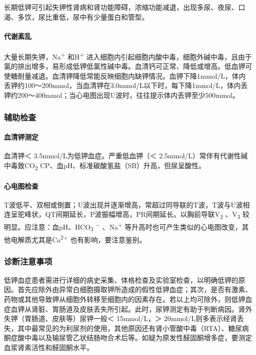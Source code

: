 长期低钾可引起失钾性肾病和肾功能障碍，浓缩功能减退，出现多尿、夜尿、口渴、多饮，尿比重低，尿中有少量蛋白和管型。

\paragraph{代谢紊乱}

大量长期失钾，Na\textsuperscript{+} 和H\textsuperscript{+}
进入细胞内引起细胞内酸中毒，细胞外碱中毒，且由于氯的排出增多，易形成低钾低氯性碱中毒。血清钙可正常、降低或增高。低血钾可使糖耐量减退。血清钾降低常能反映细胞内缺钾情况。血钾下降1mmol/L，体内丢钾约100～200mmol，当血清钾在3.0mmol/L以下时，每下降1mmol/L，体内丢钾约200～400mmol；当心电图出现U波时，往往提示体内丢钾至少500mmol。

\subsubsection{辅助检查}

\paragraph{血清钾测定}

血清钾＜ 3.5mmol/L为低钾血症。严重低血钾（＜
2.5mmol/L）常伴有代谢性碱中毒致CO\textsubscript{2}
CP、血pH、标准碳酸氢盐（SB）升高，但尿呈酸性。

\paragraph{心电图检查}

T波低平、双相或倒置；U波出现并逐渐增高，常超过同导联的T波，T波与U波相连呈驼峰状，QT间期延长，P波振幅增高，PR间期延长。以胸前导联V\textsubscript{2}
、V\textsubscript{3} 较明显。应注意：血pH、HCO\textsubscript{3}
\textsuperscript{−} 、Na\textsuperscript{+}
等升高时也可产生类似的心电图改变，其他电解质尤其是Ca\textsuperscript{2+}
也有影响，要注意鉴别。

\subsubsection{诊断注意事项}

低钾血症患者需进行详细的病史采集、体格检查及实验室检查，以明确低钾的原因。首先应除外由异常白细胞摄取钾所造成的假性低钾血症；其次，是否有激素、药物或其他导致钾从细胞外转移至细胞内的因素存在。若以上均可除外，则低钾血症血钾从肾脏、胃肠道及皮肤丢失所引起。此时，尿钾测定有助于判断病因。肾外失钾（胃肠道、皮肤等）尿钾一般＜
15mmol/L，＞
20mmol/L则多表示经肾丢失，其中最常见的为利尿剂的使用，其他原因还有肾小管酸中毒（RTA）、糖尿病酮症酸中毒以及输尿管乙状结肠吻合术后等。如疑为原发性醛固酮增多症，要测定血浆肾素活性和醛固酮水平。

